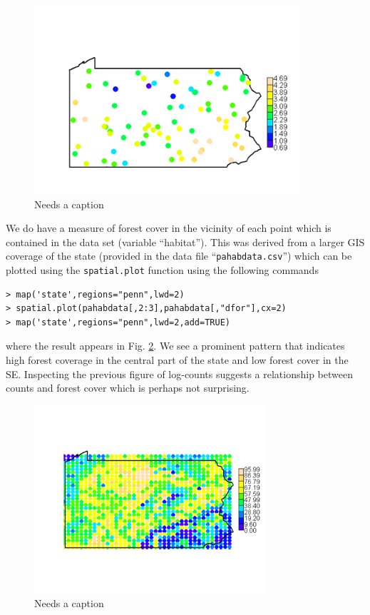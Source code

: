 \begin{figure}
\begin{center}
\includegraphics[height=2.75in]{Ch2/figs/PA1}
\end{center}
\caption{Needs a caption}
\label{glms.fig.padovecounts}
\end{figure}

We do have a measure of forest cover in the vicinity of each point
which is contained in the data set (variable ``habitat''). This was derived
from a larger GIS coverage of the state (provided in the data file
``\mbox{\tt pahabdata.csv}'') which can be plotted using the \mbox{\tt spatial.plot} function
using the following commands
{\small
\begin{verbatim}
> map('state',regions="penn",lwd=2)
> spatial.plot(pahabdata[,2:3],pahabdata[,"dfor"],cx=2)
> map('state',regions="penn",lwd=2,add=TRUE)
\end{verbatim}
}
where the result appears in Fig. \ref{glms.fig.paforest}.
We see a prominent pattern that indicates high forest coverage in the
central part of the state and low forest cover in the SE.  Inspecting
the previous figure of log-counts suggests a relationship between
counts and forest cover which is perhaps not surprising.
\begin{figure}
\begin{center}
\includegraphics[height=2.75in]{Ch2/figs/PA2}
\end{center}
\caption{Needs a caption}
\label{glms.fig.paforest}
\end{figure}

